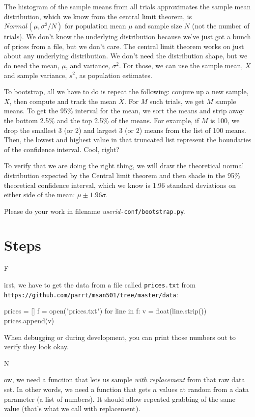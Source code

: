 \documentclass[titlepage]{tufte-book}
\newcounter{problem}
\newcommand{\step}[1]{{}
\vspace{4pt} \noindent {\bf \theproblem. }#1\addtocounter{problem}{1}}
\begin{document}
\begin{fullwidth}
The histogram of the sample means from all trials approximates the sample mean distribution, which we know from the central limit theorem, is $Normal(\mu, \sigma^2/N)$ for population mean $\mu$ and sample size $N$ (not the number of trials). We don't know the underlying distribution because we've just got a bunch of prices from a file, but we don't care. The central limit theorem works on just about any underlying distribution. We don't need the distribution shape, but we do need the mean, $\mu$, and variance, $\sigma^2$. For those, we can use the sample mean, $\overline{X}$ and sample variance, $s^2$, as population estimates.

To bootstrap, all we have to do is repeat the following: conjure up a new sample, $X$, then compute and track the mean $\overline{X}$.  For $M$ such trials, we get $M$ sample means.  To get the 95\% interval for the mean, we sort the means and strip away the bottom 2.5\% and the top 2.5\% of the means. For example, if $M$ is 100, we drop the smallest 3 (or 2) and largest 3 (or 2) means from the list of 100 means. Then, the lowest and highest value in that truncated list represent the boundaries of the confidence interval. Cool, right?

To verify that we are doing the right thing, we will draw the theoretical normal distribution expected by the Central limit theorem and then shade in the 95\% theoretical confidence interval, which we know is 1.96 standard deviations on either side of the mean: $\mu \pm 1.96\sigma$.

Please do your work in filename {\em userid}{\tt -conf/bootstrap.py}.

\section{Steps}

\step First, we have to get the data from a file called {\tt prices.txt} from \\
{\tt\small https://github.com/parrt/msan501/tree/master/data}:

\begin{pyverbatim}
prices = []
f = open("prices.txt")
for line in f:
	v = float(line.strip())
	prices.append(v)
\end{pyverbatim}

When debugging or during development, you can print those numbers out to verify they look okay.

\step Now, we need a function that lets us sample {\em with replacement} from that raw data set. In other words, we need a function that gets $n$ values at random from a data parameter (a list of numbers). It should allow repeated grabbing of the same value (that's what we call with replacement).


\end{fullwidth}
\end{document}
